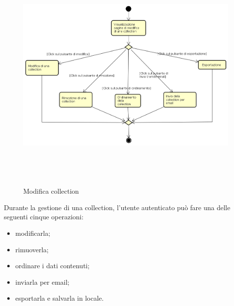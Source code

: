 \begin{figure}[H]
\begin{center}
\includegraphics[height=12cm]{res/sections/backend/activities/modificaCollection.png}
\caption{Modifica collection}
\end{center}
\end{figure}
Durante la gestione di una collection, l'utente autenticato può fare una delle seguenti cinque operazioni:
\begin{itemize}
\item modificarla;
\item rimuoverla;
\item ordinare i dati contenuti;
\item inviarla per email;
\item esportarla e salvarla in locale.
\end{itemize}
